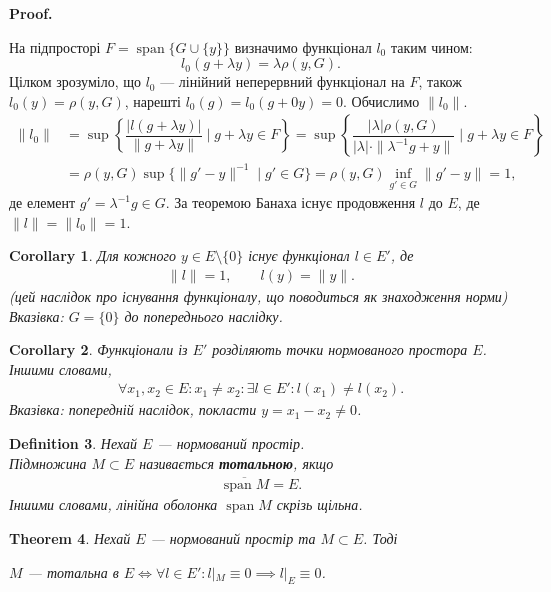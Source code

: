 \documentclass[a4paper, 10pt]{article}
\makeatletter
\theoremstyle{theoremdd}
\newtheorem{theorem}{Theorem}[subsection]
\theoremstyle{theoremdd}
\newtheorem{definition}[theorem]{Definition}
\theoremstyle{theoremdd}
\theoremstyle{theoremdd}
\theoremstyle{theoremdd}
\theoremstyle{theoremdd}
\theoremstyle{theoremdd}
\theoremstyle{theoremdd}
\newtheorem{corollary}[theorem]{Corollary}
\renewenvironment{proof}[1][Proof.\\]{\par
\pushQED{\hfill \qed}%
\normalfont \topsep6\p@\@plus6\p@\relax
\trivlist
\item\relax
{\bfseries
#1\@addpunct{.}}\hspace\labelsep\ignorespaces
}{%
\popQED\endtrivlist\@endpefalse
}
\DeclareMathOperator{\linspan}{span}
\makeatother
\begin{document}
\begin{proof}
На підпросторі $F = \linspan\{G \cup \{y\}\}$ визначимо функціонал $l_0$ таким чином:
\[
l_0(g + \lambda y) = \lambda \rho(y,G).
\]
Цілком зрозуміло, що $l_0$ --- лінійний неперервний функціонал на $F$, також $l_0(y) = \rho(y,G)$, нарешті $l_0(g) = l_0(g+0y) = 0$. Обчислимо $\|l_0\|$.
\begin{align*}
\|l_0\| & = \sup \left\{ \dfrac{|l(g+\lambda y)|}{\|g+\lambda y\|} \mid g + \lambda y \in F \right\} = \sup\left\{ \dfrac{|\lambda| \rho(y,G)}{|\lambda| \cdot \|\lambda^{-1}g + y \|} \mid g+\lambda y \in F \right\} \\
& = \rho(y,G) \sup \{ \|g'-y\|^{-1} \mid g' \in G \} = \rho(y,G) \inf_{g' \in G} \|g'-y\| = 1,
\end{align*}
де елемент $g' = \lambda^{-1}g \in G$. За теоремою Банаха існує продовження $l$ до $E$, де $\|l\| = \|l_0\| = 1$.
\end{proof}

\begin{corollary}
Для кожного $y \in E \setminus \{0\}$ існує функціонал $l \in E'$, де
\begin{align*}
\|l\| = 1,\qquad l(y) = \|y\|.
\end{align*}
\textit{(цей наслідок про існування функціоналу, що поводиться як знаходження норми)}\\
\textit{Вказівка: $G = \{0\}$ до попереднього наслідку}.
\end{corollary}

\begin{corollary}
Функціонали із $E'$ розділяють точки нормованого простора $E$. Іншими словами, 
\begin{align*}
\forall x_1,x_2 \in E: x_1 \neq x_2: \exists l \in E': l(x_1) \neq l(x_2).
\end{align*}
\textit{Вказівка: попередній наслідок, покласти $y = x_1 - x_2 \neq 0$.}
\end{corollary}

\begin{definition}
Нехай $E$ --- нормований простір.\\
Підмножина $M \subset E$ називається \textbf{тотальною}, якщо
\begin{align*}
\overline{\linspan{M}} = E.
\end{align*}
Іншими словами, лінійна оболонка $\linspan M$ скрізь щільна.
\end{definition}

\begin{theorem}
Нехай $E$ --- нормований простір та $M \subset E$. Тоді
\begin{center}
$M$ --- тотальна в $E \iff \forall l \in E': l|_M \equiv 0 \implies l|_E \equiv 0$.
\end{center}
\end{theorem}
\end{document}
